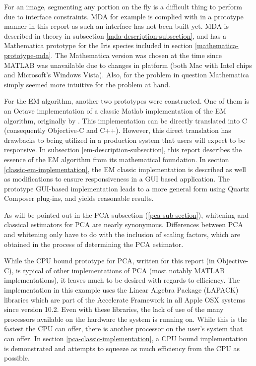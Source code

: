 \documentclass[11pt]{article}
\begin{document}
For an image, segmenting any portion on the fly is a difficult thing to perform due to interface constraints.  MDA for example is complied with in a prototype manner in this report as such an interface has not been built yet.  MDA is described in theory in subsection \ref{mda-description-subsection}, and has a Mathematica prototype for the Iris species included in section \ref{mathematica-prototype-mda}.  The Mathematica version was chosen at the time since MATLAB was unavailable due to changes in platform (both Mac with Intel chips and Microsoft's Windows Vista).  Also, for the problem in question Mathematica simply seemed more intuitive for the problem at hand.   



For the EM algorithm, another two prototypes were constructed.  One of them is an Octave implementation of a classic Matlab implementation of the EM algorithm, originally by \cite{yamazaki98introduction}.  This implementation can be directly translated into C (consequently Objective-C and C++).  However, this direct translation has drawbacks to being utilized in a production system that users will expect to be responsive.  In subsection \ref{em-description-subsection}, this report describes the essence of the EM algorithm from its mathematical foundation.  In section \ref{classic-em-implementation}, the EM classic implementation is described as well as modifications to ensure responsiveness in a GUI based application.  The prototype GUI-based implementation leads to a more general form using Quartz Composer plug-ins, and yields reasonable results.

As will be pointed out in the PCA subsection (\ref{pca-sub-section}), whitening and classical estimators for PCA are nearly synonymous.  Differences between PCA and whitening only have to do with the inclusion of scaling factors, which are obtained in the process of determining the PCA estimator.

While the CPU bound prototype for PCA, written for this report (in Objective-C), is typical of other implementations of PCA (most notably MATLAB implementations), it leaves much to be desired with regards to efficiency.  The implementation in this example uses the Linear Algebra Package (LAPACK) libraries which are part of the Accelerate Framework in all Apple OSX systems since version 10.2.   Even with these libraries, the lack of use of the many processors available on the hardware the system is running on.  While this is the fastest the CPU can offer, there is another processor on the user's system that can offer.   In section \ref{pca-classic-implementation}, a CPU bound implementation is demonstrated and attempts to squeeze as much efficiency from the CPU as possible.  %
\end{document}
